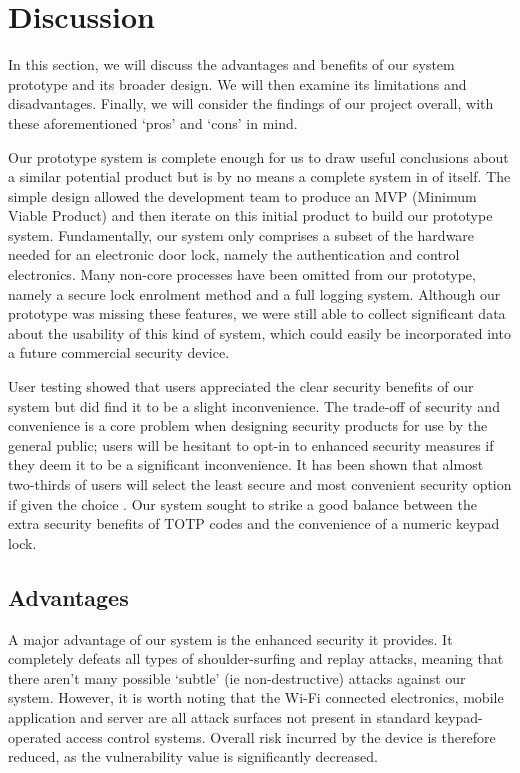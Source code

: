 \documentclass[conference]{IEEEtran}
\begin{document}
\section{Discussion}
In this section, we will discuss the advantages and benefits of our system prototype and its broader design.
We will then examine its limitations and disadvantages.
Finally, we will consider the findings of our project overall, with these aforementioned `pros' and `cons' in mind.

Our prototype system is complete enough for us to draw useful conclusions about a similar potential product but is by no means a complete system in of itself.
The simple design allowed the development team to produce an MVP (Minimum Viable Product) and then iterate on this initial product to build our prototype system.
Fundamentally, our system only comprises a subset of the hardware needed for an electronic door lock, namely the authentication and control electronics.
Many non-core processes have been omitted from our prototype, namely a secure lock enrolment method and a full logging system.
Although our prototype was missing these features, we were still able to collect significant data about the usability of this kind of system, which could easily be incorporated into a future commercial security device.

User testing showed that users appreciated the clear security benefits of our system but did find it to be a slight inconvenience.
The trade-off of security and convenience is a core problem when designing security products for use by the general public; users will be hesitant to opt-in to enhanced security measures if they deem it to be a significant inconvenience.
It has been shown that almost two-thirds of users will select the least secure and most convenient security option if given the choice \cite{bben1}.
Our system sought to strike a good balance between the extra security benefits of TOTP codes and the convenience of a numeric keypad lock.

\subsection{Advantages}

A major advantage of our system is the enhanced security it provides. It completely defeats all types of shoulder-surfing and replay attacks, meaning that there aren't many possible `subtle' (ie non-destructive) attacks against our system.
However, it is worth noting that the Wi-Fi connected electronics, mobile application and server are all attack surfaces not present in standard keypad-operated access control systems.
Overall risk incurred by the device is therefore reduced, as the vulnerability value is significantly decreased.
\end{document}
